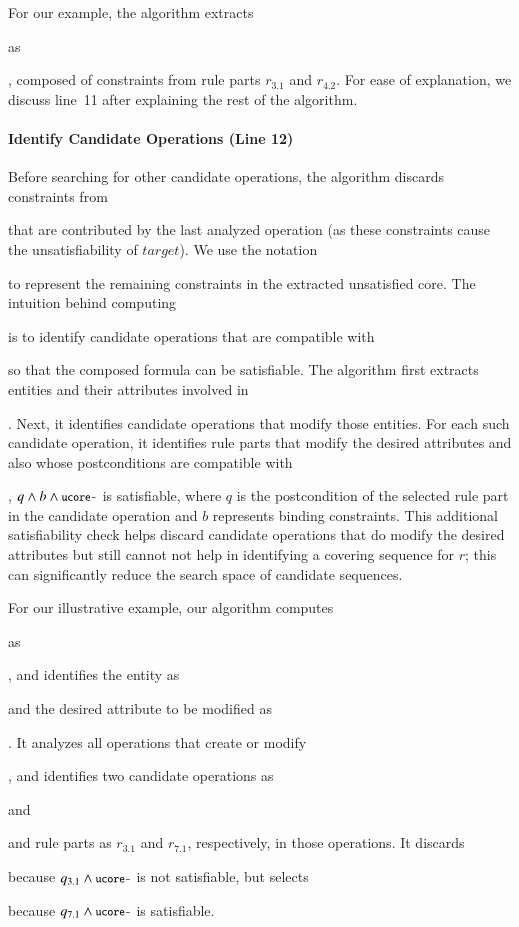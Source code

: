 For our example, the algorithm extracts \subject{ucore} as \subject{ord.total =
  0 $\wedge$ ord.total > 0}, composed of constraints from rule parts $r_{3.1}$
and $r_{4.2}$. For ease of explanation, we discuss line~11 after explaining the
rest of the algorithm.


\vskip -7pt
\paragraph*{Identify Candidate Operations (Line 12)}
Before searching for other candidate operations, the algorithm discards
constraints from \subject{ucore} that are contributed by the last analyzed
operation (as these constraints cause the unsatisfiability of $target$).  We use
the notation \subject{ucore-} to represent the remaining constraints in the
extracted unsatisfied core. The intuition behind computing \subject{ucore-} is
to identify candidate operations that are compatible with \subject{ucore-} so
that the composed formula can be satisfiable.  The algorithm first extracts
entities and their attributes involved in \subject{ucore-}. Next, it identifies
candidate operations that modify those entities.  For each such candidate
operation, it identifies rule parts that modify the desired attributes and also
whose postconditions are compatible with \subject{ucore-}, \ie{} $q \wedge b
\wedge \subject{ucore-}$ is satisfiable, where $q$ is the postcondition of the
selected rule part in the candidate operation and $b$ represents binding constraints.
This additional satisfiability check helps discard candidate operations that do
modify the desired attributes but still cannot not help in identifying a
covering sequence for $r$; this can significantly reduce the search space of
candidate sequences.

For our illustrative example, our algorithm computes \subject{ucore-} as
\subject{ord.total > 0}, and identifies the entity as \subject{Order} and the
desired attribute to be modified as \subject{total}. It analyzes all operations
that create or modify \subject{Order}, and identifies two candidate operations
as \subject{CreateOrder} and \subject{AddItemToOrder} and rule parts as
$r_{3.1}$ and $r_{7.1}$, respectively, in those operations.  It discards
\subject{CreateOrder} because $q_{3.1} \wedge \subject{ucore-}$ is not
satisfiable, but selects \subject{AddItemToOrder} because $q_{7.1} \wedge
\subject{ucore-}$ is satisfiable.

